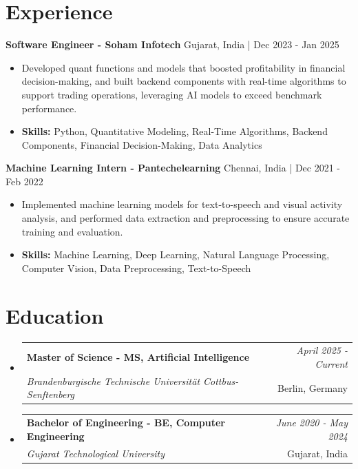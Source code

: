 \documentclass[a4paper,11pt]{article}
\makeatletter
\newcommand{\resumeSubheading}[4]{
\vspace{0.5mm}\item
    \begin{tabular*}{\linewidth}[t]{l@{\extracolsep{\fill}}r}
        \textbf{#1} & \textit{\footnotesize{#4}} \\
        \textit{\footnotesize{#3}} &  \footnotesize{#2}\\
    \end{tabular*}
    \vspace{-2.4mm}
}
\makeatother
\begin{document}
\section{\textbf{Experience}}


\vspace{1mm}
  \textbf{Software Engineer - Soham Infotech} \hfill Gujarat, India | Dec 2023 - Jan 2025
\vspace{-1.5mm} %
\begin{itemize}
  \item Developed quant functions and models that boosted profitability in financial decision-making, and built backend components with real-time algorithms to support trading operations, leveraging AI models to exceed benchmark performance.

\vspace{-2mm}
  \item \textbf{Skills:} Python, Quantitative Modeling, Real-Time Algorithms, Backend Components, Financial Decision-Making, Data Analytics
\end{itemize}

\vspace{1mm}
  \textbf{Machine Learning Intern - Pantechelearning} \hfill Chennai, India | Dec 2021 - Feb 2022
\vspace{-1.5mm} %
\begin{itemize}
  \item Implemented machine learning models for text-to-speech and visual activity analysis, and performed data extraction and preprocessing to ensure accurate training and evaluation.
\vspace{-2mm}
  \item \textbf{Skills:} Machine Learning, Deep Learning, Natural Language Processing, Computer Vision, Data Preprocessing, Text-to-Speech
\end{itemize}\section{\textbf{Education}}
\vspace{-0.4mm}

\begin{itemize}[leftmargin=0.15in, label={}]
\resumeSubheading
{Master of Science - MS, Artificial Intelligence }{Berlin, Germany}
{Brandenburgische Technische Universität Cottbus-Senftenberg  }{April 2025 - Current}

\vspace{1.0mm} %
\resumeSubheading
{Bachelor of Engineering - BE, Computer Engineering  }{Gujarat, India}
{Gujarat Technological University }{June 2020 - May 2024}

\end{itemize}
\end{document}
